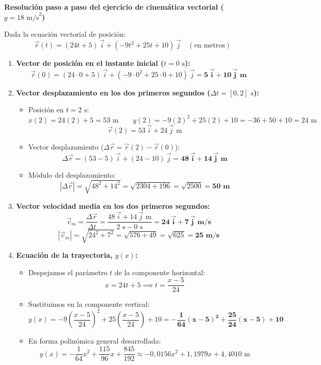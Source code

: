 ﻿\documentclass[11pt,a4paper]{article}
\begin{document}
\pagestyle{empty}

\noindent\textbf{Resolución paso a paso del ejercicio de cinemática vectorial ($g = 18\text{ m/s}^2$)}

\vspace{0.3cm}
\noindent Dada la ecuación vectorial de posición:
\[
\vec{r}(t) = (24t + 5)\,\vec{i} + (-9t^2 + 25t + 10)\,\vec{j} \quad (\text{en metros})
\]

\begin{enumerate}[label=\textbf{\alph*)}, leftmargin=2em, itemsep=7pt]
    \item \textbf{Vector de posición en el instante inicial ($t = 0\text{ s}$):}
    \[
    \vec{r}(0) = (24\cdot 0 + 5)\,\vec{i} + (-9\cdot 0^2 + 25\cdot 0 + 10)\,\vec{j} = \mathbf{5\,\vec{i} + 10\,\vec{j}\text{ m}}
    \]

    \item \textbf{Vector desplazamiento en los dos primeros segundos ($\Delta t = [0, 2]\text{ s}$):}
    \begin{itemize}[leftmargin=1.5em, itemsep=3pt]
        \item Posición en $t = 2\text{ s}$:
        \[
        x(2) = 24(2) + 5 = 53\text{ m} \qquad y(2) = -9(2)^2 + 25(2) + 10 = -36 + 50 + 10 = 24\text{ m}
        \]
        \[
        \vec{r}(2) = 53\,\vec{i} + 24\,\vec{j}\text{ m}
        \]
        \item Vector desplazamiento ($\Delta\vec{r} = \vec{r}(2) - \vec{r}(0)$):
        \[
        \Delta\vec{r} = (53 - 5)\,\vec{i} + (24 - 10)\,\vec{j} = \mathbf{48\,\vec{i} + 14\,\vec{j}\text{ m}}
        \]
        \item Módulo del desplazamiento:
        \[
        |\Delta\vec{r}| = \sqrt{48^2 + 14^2} = \sqrt{2304 + 196} = \sqrt{2500} = \mathbf{50\text{ m}}
        \]
    \end{itemize}

    \item \textbf{Vector velocidad media en los dos primeros segundos:}
    \[
    \vec{v}_m = \frac{\Delta\vec{r}}{\Delta t} = \frac{48\,\vec{i} + 14\,\vec{j}\text{ m}}{2\text{ s} - 0\text{ s}} = \mathbf{24\,\vec{i} + 7\,\vec{j}\text{ m/s}}
    \]
    \[
    |\vec{v}_m| = \sqrt{24^2 + 7^2} = \sqrt{576 + 49} = \sqrt{625} = \mathbf{25\text{ m/s}}
    \]

    \item \textbf{Ecuación de la trayectoria, $y(x)$:}
    \begin{itemize}[leftmargin=1.5em, itemsep=3pt]
        \item Despejamos el parámetro $t$ de la componente horizontal:
        \[
        x = 24t + 5 \implies t = \frac{x - 5}{24}
        \]
        \item Sustituimos en la componente vertical:
        \[
        y(x) = -9\left(\frac{x - 5}{24}\right)^2 + 25\left(\frac{x - 5}{24}\right) + 10 = \mathbf{-\frac{1}{64}(x - 5)^2 + \frac{25}{24}(x - 5) + 10}
        \]
        \item En forma polinómica general desarrollada:
        \[
        y(x) = -\frac{1}{64}x^2 + \frac{115}{96}x + \frac{845}{192} \approx -0{,}0156x^2 + 1{,}1979x + 4{,}4010\text{ m}
        \]
    \end{itemize}


\end{enumerate}
\end{document}
